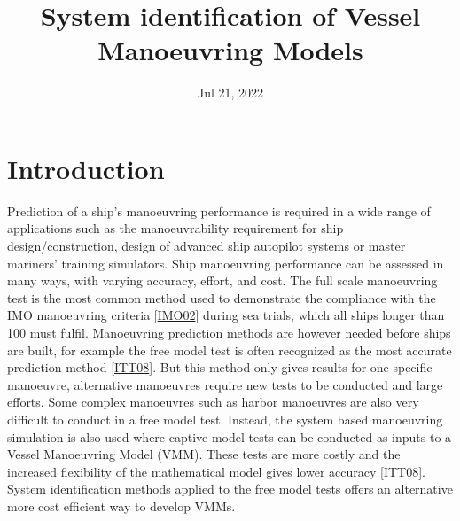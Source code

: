 \documentclass[review]{elsarticle}
\title{System identification of Vessel Manoeuvring Models}
\date{Jul 21, 2022}
\begin{document}



\pagestyle{empty}

\pagestyle{plain}

\pagestyle{normal}
\label{\detokenize{index::doc}}



\section{Introduction}
\label{\detokenize{00.02_introduction:introduction}}\label{\detokenize{00.02_introduction::doc}}
\sphinxAtStartPar
Prediction of a ship’s manoeuvring performance is required in a wide range of applications such as the manoeuvrability requirement for ship design/construction, design of advanced ship autopilot systems or master mariners’ training simulators. Ship manoeuvring performance can be assessed in many ways, with varying accuracy, effort, and cost. The full scale manoeuvring test is the most common method used to demonstrate the compliance with the IMO manoeuvring criteria {[}\hyperlink{cite.bibligraphy:id16}{IMO02}{]} during sea trials, which all ships longer than 100 must fulfil. Manoeuvring prediction methods are however needed before ships are built, for example the free model test is often recognized as the most accurate prediction method {[}\hyperlink{cite.bibligraphy:id75}{ITT08}{]}. 
But this method only gives results for one specific manoeuvre, alternative manoeuvres require new tests to be conducted and large efforts. Some complex manoeuvres such as harbor manoeuvres are also very difficult to conduct in a free model test.
Instead, the system based manoeuvring simulation is also used where captive model tests can be conducted as inputs to a Vessel Manoeuvring Model (VMM). These tests are more costly and the increased flexibility of the mathematical model gives lower accuracy {[}\hyperlink{cite.bibligraphy:id75}{ITT08}{]}. 
System identification methods applied to the free model tests offers an alternative more cost efficient way to develop VMMs.
\end{document}
